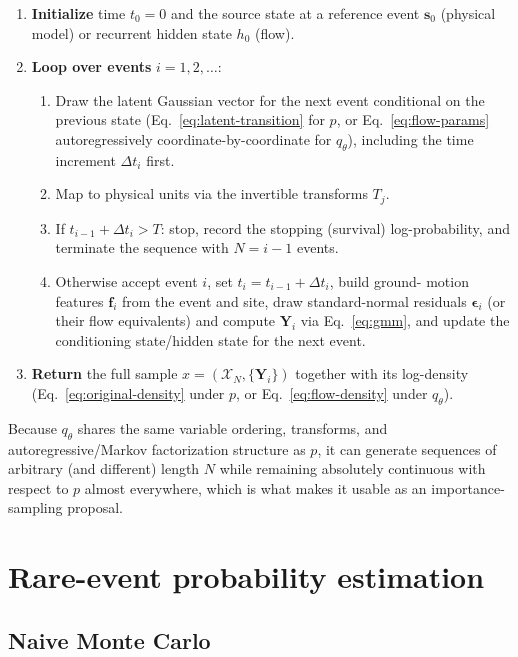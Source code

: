 \documentclass[11pt]{article}
\newcommand{\dt}{\Delta t}
\newcommand{\bs}{\mathbf s}
\begin{document}
\begin{enumerate}[label=\arabic*.]
\item \textbf{Initialize} time $t_0 = 0$ and the source state at a reference
event $\bs_0$ (physical model) or recurrent hidden state $h_0$ (flow).
\item \textbf{Loop over events} $i = 1, 2, \dots$:
  \begin{enumerate}[label=(\alph*)]
  \item Draw the latent Gaussian vector for the next event conditional on the
  previous state (Eq.~\eqref{eq:latent-transition} for $p$, or
  Eq.~\eqref{eq:flow-params} autoregressively coordinate-by-coordinate for
  $q_\theta$), including the time increment $\dt_i$ first.
  \item Map to physical units via the invertible transforms $T_j$.
  \item If $t_{i-1} + \dt_i > T$: stop, record the stopping (survival)
  log-probability, and terminate the sequence with $N = i-1$ events.
  \item Otherwise accept event $i$, set $t_i = t_{i-1}+\dt_i$, build ground-
  motion features $\bm f_i$ from the event and site, draw standard-normal
  residuals $\bm\epsilon_i$ (or their flow equivalents) and compute
  $\bm Y_i$ via Eq.~\eqref{eq:gmm}, and update the conditioning state/hidden
  state for the next event.
  \end{enumerate}
\item \textbf{Return} the full sample $x = (\mathcal X_N, \{\bm Y_i\})$
together with its log-density (Eq.~\eqref{eq:original-density} under $p$, or
Eq.~\eqref{eq:flow-density} under $q_\theta$).
\end{enumerate}

Because $q_\theta$ shares the same variable ordering, transforms, and
autoregressive/Markov factorization structure as $p$, it can generate
sequences of arbitrary (and different) length $N$ while remaining
absolutely continuous with respect to $p$ almost everywhere, which is what
makes it usable as an importance-sampling proposal.

\section{Rare-event probability estimation}

\subsection{Naive Monte Carlo}
\end{document}
